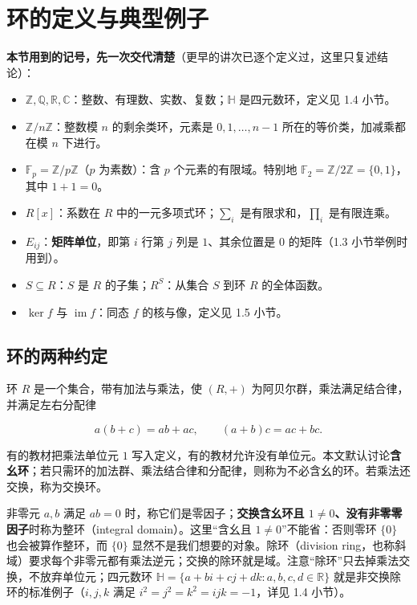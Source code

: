\section{环的定义与典型例子}


\textbf{本节用到的记号，先一次交代清楚}（更早的讲次已逐个定义过，这里只复述结论）：

\begin{itemize}
\item $\mathbb Z,\mathbb Q,\mathbb R,\mathbb C$：整数、有理数、实数、复数；$\mathbb H$ 是四元数环，定义见 1.4 小节。
\item $\mathbb Z/n\mathbb Z$：整数模 $n$ 的剩余类环，元素是 $0,1,\dots,n-1$ 所在的等价类，加减乘都在模 $n$ 下进行。
\item $\mathbb F_p=\mathbb Z/p\mathbb Z$（$p$ 为素数）：含 $p$ 个元素的有限域。特别地 $\mathbb F_2=\mathbb Z/2\mathbb Z=\{0,1\}$，其中 $1+1=0$。
\item $R[x]$：系数在 $R$ 中的一元多项式环；$\sum_i$ 是有限求和，$\prod_i$ 是有限连乘。
\item $E_{ij}$：\textbf{矩阵单位}，即第 $i$ 行第 $j$ 列是 $1$、其余位置是 $0$ 的矩阵（1.3 小节举例时用到）。
\item $S\subseteq R$：$S$ 是 $R$ 的子集；$R^S$：从集合 $S$ 到环 $R$ 的全体函数。
\item $\ker f$ 与 $\operatorname{im}f$：同态 $f$ 的核与像，定义见 1.5 小节。
\end{itemize}


\subsection{环的两种约定}


环 $R$ 是一个集合，带有加法与乘法，使 $(R,+)$ 为阿贝尔群，乘法满足结合律，并满足左右分配律

\[a(b+c)=ab+ac,\qquad (a+b)c=ac+bc.\]

有的教材把乘法单位元 $1$ 写入定义，有的教材允许没有单位元。本文默认讨论\textbf{含幺环}；若只需环的加法群、乘法结合律和分配律，则称为不必含幺的环。若乘法还交换，称为交换环。

非零元 $a,b$ 满足 $ab=0$ 时，称它们是零因子；\textbf{交换含幺环且 $1\ne0$、没有非零零因子}时称为整环（integral domain）。这里“含幺且 $1\ne0$”不能省：否则零环 $\{0\}$ 也会被算作整环，而 $\{0\}$ 显然不是我们想要的对象。除环（division ring，也称斜域）要求每个非零元都有乘法逆元；交换的除环就是域。注意“除环”只去掉乘法交换，不放弃单位元；四元数环 $\mathbb H=\{a+bi+cj+dk:a,b,c,d\in\mathbb R\}$ 就是非交换除环的标准例子（$i,j,k$ 满足 $i^2=j^2=k^2=ijk=-1$，详见 1.4 小节）。

